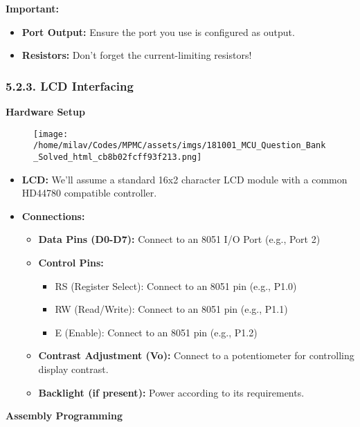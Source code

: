 \documentclass[
]{article}
\begin{document}
\textbf{Important:}

\begin{itemize}
\item
  \textbf{Port Output:} Ensure the port you use is configured as output.
\item
  \textbf{Resistors:} Don't forget the current-limiting resistors!
\end{itemize}

\hypertarget{523-lcd-interfacing}{%
\subsubsection{5.2.3. LCD Interfacing}\label{523-lcd-interfacing}}

\textbf{Hardware Setup}

\begin{figure}
\centering
\texttt{[image: /home/milav/Codes/MPMC/assets/imgs/181001\_MCU\_Question\_Bank\_Solved\_html\_cb8b02fcff93f213.png]}
\caption{}
\end{figure}

\begin{itemize}
\item
  \textbf{LCD:} We'll assume a standard 16x2 character LCD module with a
  common HD44780 compatible controller.
\item
  \textbf{Connections:}

  \begin{itemize}
  \item
    \textbf{Data Pins (D0-D7):} Connect to an 8051 I/O Port (e.g., Port
    2)
  \item
    \textbf{Control Pins:}

    \begin{itemize}
    \item
      RS (Register Select): Connect to an 8051 pin (e.g., P1.0)
    \item
      RW (Read/Write): Connect to an 8051 pin (e.g., P1.1)
    \item
      E (Enable): Connect to an 8051 pin (e.g., P1.2)
    \end{itemize}
  \item
    \textbf{Contrast Adjustment (Vo):} Connect to a potentiometer for
    controlling display contrast.
  \item
    \textbf{Backlight (if present):} Power according to its
    requirements.
  \end{itemize}
\end{itemize}

\textbf{Assembly Programming}
\end{document}
